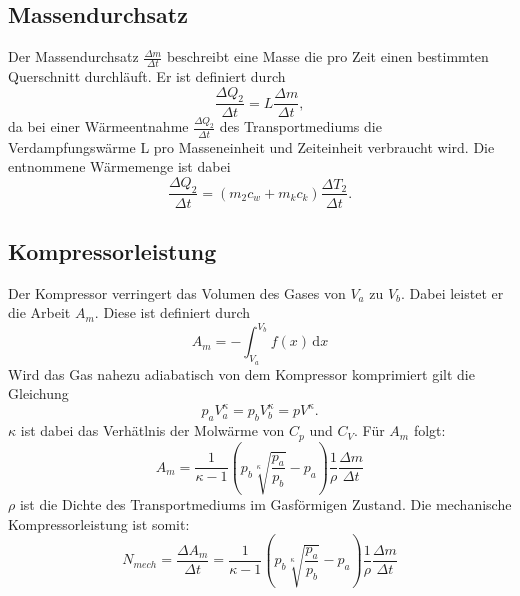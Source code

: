 \subsection{Massendurchsatz}
Der Massendurchsatz $\frac{\Delta m}{\Delta t}$ beschreibt eine Masse die pro Zeit einen bestimmten Querschnitt durchläuft.
Er ist definiert durch
\begin{equation}
  \frac{\Delta Q_2}{\Delta t} = L\frac{\Delta m}{\Delta t} ,
\end{equation}
da bei einer Wärmeentnahme $\frac{\Delta Q_2}{\Delta t}$ des Transportmediums die Verdampfungswärme L pro Masseneinheit und Zeiteinheit
verbraucht wird. Die entnommene Wärmemenge ist dabei
\begin{equation}
  \frac{\Delta Q_2}{\Delta t} = (m_2c_w + m_kc_k)\frac{\Delta T_2}{\Delta t} .
\end{equation}
\subsection{Kompressorleistung}
Der Kompressor verringert das Volumen des Gases von $V_a$ zu $V_b$. Dabei leistet
er die Arbeit $A_m$. Diese ist definiert durch
\begin{equation}
  A_m = - \int_{V_a}^{V_b} f(x) \, \mathrm{d}x
\end{equation}
Wird das Gas nahezu adiabatisch von dem Kompressor komprimiert gilt die Gleichung
\begin{equation}
  p_a V_a^\kappa = p_b V_b^\kappa = pV^\kappa.
\end{equation}
$\kappa$ ist dabei das Verhätlnis der Molwärme von $C_p$ und $C_V$.
Für $A_m$ folgt:
\begin{equation}
  A_m = \frac{1}{\kappa -1}(p_b\sqrt[\kappa]{\frac{p_a}{p_b}}-p_a)\frac{1}{\rho}\frac{\Delta m}{\Delta t}
\end{equation}
$\rho$ ist die Dichte des Transportmediums im Gasförmigen Zustand. Die mechanische Kompressorleistung
ist somit:
\begin{equation}
  N_{mech} = \frac{\Delta A_m}{\Delta t} = \frac{1}{\kappa -1} \left(p_b \sqrt[\kappa]{\frac{p_a}{p_b}}-p_a\right)\frac{1}{\rho}\frac{\Delta m}{\Delta t}
\end{equation}
\label{sec:Theorie}
